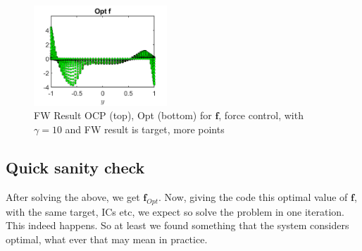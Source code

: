 \documentclass[11pt, a4paper]{article}
\theoremstyle{definition}
\newcommand{\Con}{\mathbf{f}}
\begin{document}
\begin{figure}
	\includegraphics[width=5cm]{OptCont6.png}
	\caption{FW Result OCP (top), Opt (bottom) for $\Con $, force control, with $\gamma =10$ and FW result is target, more points}
	\label{Figure12}
\end{figure}

\subsection{Quick sanity check}
After solving the above, we get $\Con_{Opt}$. Now, giving the code this optimal value of $\Con$, with the same target, ICs etc, we expect so solve the problem in one iteration. This indeed happens. So at least we found something that the system considers optimal, what ever that may mean in practice.
\end{document}
